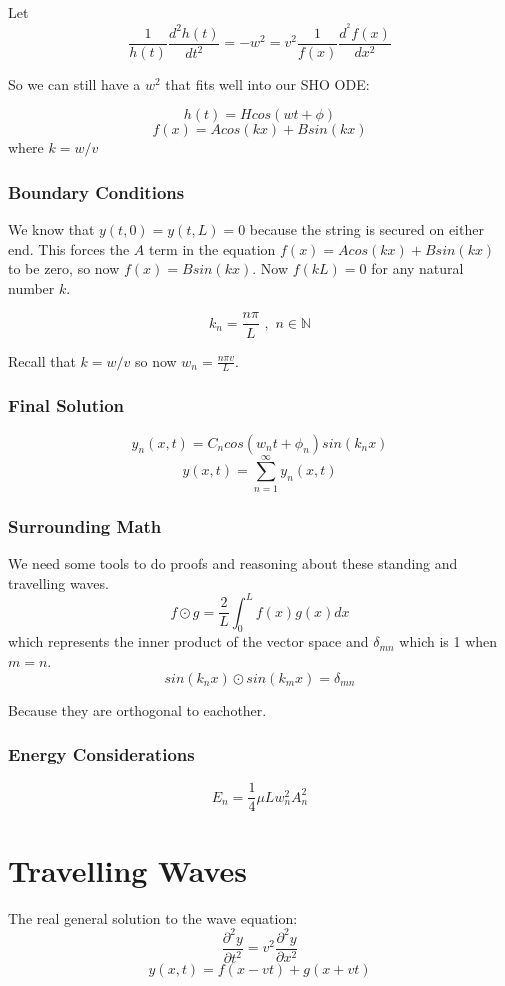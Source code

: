 \documentclass[a4paper,12pt]{report}
\begin{document}
Let $$\frac{1}{h(t)} \frac{d^2h(t)}{dt^2} = -w^2 = v^2 \frac{1}{f(x)} \frac{d^^2f(x)}{dx^2}$$

So we can still have a $w^2$ that fits well into our SHO ODE:

$$h(t) = H cos(wt + \phi)$$ $$f(x) = A cos(kx) + B sin(kx)$$ where $k = w/v$

\subsection{Boundary Conditions}
We know that $y(t, 0) = y(t, L) = 0$ because the string is secured on either end. This forces the $A$ term 
in the equation $f(x) = A cos(kx) + B sin(kx)$ to be zero, so now $f(x) = B sin(kx)$. Now $f(kL) = 0$ for 
any natural number $k$. 

$$k_n = \frac{n \pi}{L} \,\,, \,\, n \in \mathbb{N}$$

Recall that $k = w/v$ so now $w_n = \frac{n \pi v}{L}$. 

\subsection{Final Solution}
$$y_n(x, t) = C_n cos(w_n t + \phi_n)sin(k_n x)$$
$$y(x, t) = \sum_{n=1}^{\infty} y_n(x, t)$$

\subsection{Surrounding Math}
We need some tools to do proofs and reasoning about these standing and travelling waves. 
$$f \odot g = \frac{2}{L} \int_0^L f(x)g(x) dx$$
which represents the inner product of the vector space and 
$\delta_{mn}$ which is 1 when $m=n$.
$$sin(k_n x) \odot sin(k_m x) = \delta_{mn}$$

Because they are orthogonal to eachother.

\subsection{Energy Considerations}
$$E_n = \frac{1}{4} \mu L w_n^2 A_n^2$$

\chapter{Travelling Waves}
The real general solution to the wave equation: 
$$\frac{\partial^2 y}{\partial t^2} = v^2 \frac{\partial^2 y}{\partial x^2}$$
$$y(x, t) = f(x-vt) + g(x+vt)$$
\end{document}
